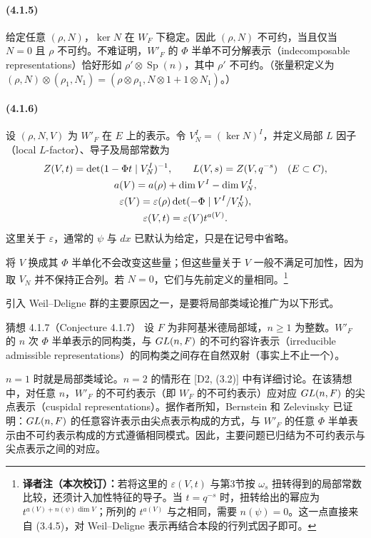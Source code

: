 \paragraph*{(4.1.5)} 给定任意 $(\rho,N)$，$\ker N$ 在 $W_F$ 下稳定。因此 $(\rho,N)$ 不可约，当且仅当 $N=0$ 且 $\rho$ 不可约。不难证明，$W'_F$ 的 $\Phi$ 半单不可分解表示（indecomposable representations）恰好形如 $\rho'\otimes\operatorname{Sp}(n)$，其中 $\rho'$ 不可约。（张量积定义为 $(\rho,N)\otimes(\rho_1,N_1)=(\rho\otimes\rho_1,N\otimes1+1\otimes N_1)$。）

\paragraph*{(4.1.6)} 设 $(\rho,N,V)$ 为 $W'_F$ 在 $E$ 上的表示。令 $V_N^I=(\ker N)^I$，并定义局部 $L$ 因子（local $L$-factor）、导子及局部常数为
\[
\begin{gathered}
 Z(V,t)=\det(1-\Phi t\mid V_N^I)^{-1},\qquad
 L(V,s)=Z(V,q^{-s})\quad(E\subset C),\\
 a(V)=a(\rho)+\dim V^I-\dim V_N^I,\\
 \varepsilon(V)=\varepsilon(\rho)\det(-\Phi\mid V^I/V_N^I),\\
 \varepsilon(V,t)=\varepsilon(V)t^{a(V)}.
\end{gathered}
\]
这里关于 $\varepsilon$，通常的 $\psi$ 与 $dx$ 已默认为给定，只是在记号中省略。

将 $V$ 换成其 $\Phi$ 半单化不会改变这些量；但这些量关于 $V$ 一般不满足可加性，因为取 $V_N$ 并不保持正合列。若 $N=0$，它们与先前定义的量相同。\footnote{\textbf{译者注（本次校订）：}若将这里的 $\varepsilon(V,t)$ 与第3节按 $\omega_s$ 扭转得到的局部常数比较，还须计入加性特征的导子。当 $t=q^{-s}$ 时，扭转给出的幂应为 $t^{a(V)+n(\psi)\dim V}$；所列的 $t^{a(V)}$ 与之相同，需要 $n(\psi)=0$。这一点直接来自 (3.4.5)，对 Weil--Deligne 表示再结合本段的行列式因子即可。}

引入 Weil--Deligne 群的主要原因之一，是要将局部类域论推广为以下形式。
\begin{originaltheorem}{猜想 4.1.7（Conjecture 4.1.7）}
设 $F$ 为非阿基米德局部域，$n\geq1$ 为整数。$W'_F$ 的 $n$ 次 $\Phi$ 半单表示的同构类，与 $GL(n,F)$ 的不可约容许表示（irreducible admissible representations）的同构类之间存在自然双射（事实上不止一个）。
\end{originaltheorem}
$n=1$ 时就是局部类域论。$n=2$ 的情形在 [D2, (3.2)] 中有详细讨论。在该猜想中，对任意 $n$，$W'_F$ 的不可约表示（即 $W_F$ 的不可约表示）应对应 $GL(n,F)$ 的尖点表示（cuspidal representations）。据作者所知，Bernstein 和 Zelevinsky 已证明：$GL(n,F)$ 的任意容许表示由尖点表示构成的方式，与 $W'_F$ 的任意 $\Phi$ 半单表示由不可约表示构成的方式遵循相同模式。因此，主要问题已归结为不可约表示与尖点表示之间的对应。

